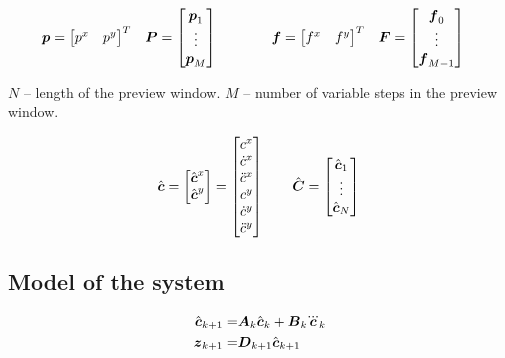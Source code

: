 \documentclass[12pt,a4paper]{article}
\begin{document}
\begin{align*}
\\
%
\fp = \begin{bmatrix} p^x & p^y \end{bmatrix}^T
\quad &
\FP = \begin{bmatrix} \fp_1 \\ \vdots \\ \fp_M \end{bmatrix}
\quad\quad\quad&
\fd = \begin{bmatrix} f^x & f^y \end{bmatrix}^T
\quad &
\FD = \begin{bmatrix} \fd_0 \\ \vdots \\ \fd_{M-1} \end{bmatrix}
\end{align*}

$N$ -- length of the preview window.
$M$ -- number of variable steps in the preview window.

\begin{equation*}
\hat{\mbox{\boldmath $c$}} = \begin{bmatrix} \hat{\mbox{\boldmath $c$}}^x \\ \hat{\mbox{\boldmath $c$}}^y \end{bmatrix} =
          \begin{bmatrix} c^x \\ \dot{c}^x \\ \ddot{c}^x \\ c^y \\ \dot{c}^y \\ \ddot{c}^y \end{bmatrix}
\quad\quad
\hat{\mbox{\boldmath $C$}} = \begin{bmatrix} \hat{\mbox{\boldmath $c$}}_1 \\ \vdots \\ \hat{\mbox{\boldmath $c$}}_N \end{bmatrix}\\
\end{equation*}




\subsection{Model of the system}
\begin{align*}
\cstate_{k+1} =& \M{A}_k \cstate_k + \M{B}_k \cjerk_k\\
\zmp_{k+1} =& \M{D}_{k+1} \cstate_{k+1}
\end{align*}
\end{document}
